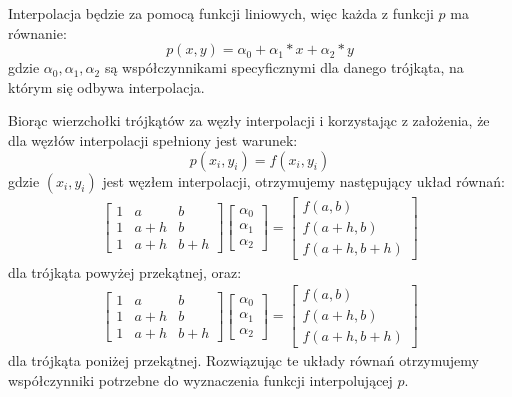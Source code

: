 \documentclass[12pt]{article}
\begin{document}
	Interpolacja będzie za pomocą funkcji liniowych, więc każda z funkcji $p$ ma równanie:
	$$p(x, y) = \alpha_0 + \alpha_1*x + \alpha_2*y$$
	gdzie $\alpha_0, \alpha_1, \alpha_2$ są współczynnikami specyficznymi dla danego trójkąta, na którym się odbywa interpolacja.
	
	Biorąc wierzchołki trójkątów za węzły interpolacji i korzystając z założenia, że dla węzłów interpolacji spełniony jest warunek:
	$$p(x_i, y_i) = f(x_i, y_i)$$
	gdzie $(x_i, y_i)$ jest węzłem interpolacji, otrzymujemy następujący układ równań:
	\begin{align*}
		\left[
			\begin{array}{ccc}
				1 &  a  &  b  \\
				1 & a+h &  b  \\
				1 & a+h & b+h
			\end{array}
		\right]
		\left[
			\begin{array}{c}
				\alpha_0 \\
				\alpha_1 \\
				\alpha_2
			\end{array}
		\right]
		=		
		\left[
			\begin{array}{c}
				  f(a, b)   \\
				 f(a+h, b)  \\
				f(a+h, b+h)
			\end{array}
		\right]
	\end{align*}
	dla trójkąta powyżej przekątnej, oraz:
	\begin{align*}
		\left[
			\begin{array}{ccc}
				1 &  a  &  b  \\
				1 & a+h &  b  \\
				1 & a+h & b+h
			\end{array}
		\right]
		\left[
			\begin{array}{c}
				\alpha_0 \\
				\alpha_1 \\
				\alpha_2
			\end{array}
		\right]
		=		
		\left[
			\begin{array}{c}
				  f(a, b)   \\
				 f(a+h, b)  \\
				f(a+h, b+h)
			\end{array}
		\right]
	\end{align*}
	dla trójkąta poniżej przekątnej. Rozwiązując te układy równań otrzymujemy współczynniki potrzebne do wyznaczenia funkcji interpolującej $p$.
	
\end{document}
